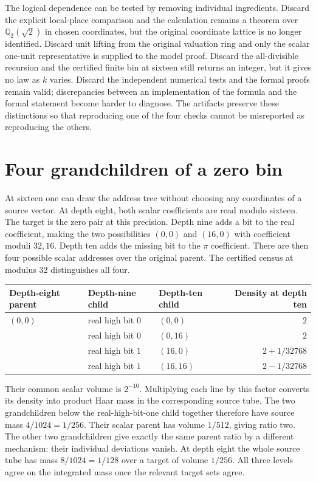 \documentclass[12pt,letterpaper]{article}
\begin{document}
The logical dependence can be tested by removing individual ingredients. Discard the explicit local-place comparison and the calculation remains a theorem over $\mathbb Q_2(\sqrt2)$ in chosen coordinates, but the original coordinate lattice is no longer identified. Discard unit lifting from the original valuation ring and only the scalar one-unit representative is supplied to the model proof. Discard the all-divisible recursion and the certified finite bin at sixteen still returns an integer, but it gives no law as $k$ varies. Discard the independent numerical tests and the formal proofs remain valid; discrepancies between an implementation of the formula and the formal statement become harder to diagnose. The artifacts preserve these distinctions so that reproducing one of the four checks cannot be misreported as reproducing the others.
\section{Four grandchildren of a zero bin}
At sixteen one can draw the address tree without choosing any coordinates of a source vector. At depth eight, both scalar coefficients are read modulo sixteen. The target is the zero pair at this precision. Depth nine adds a bit to the real coefficient, making the two possibilities $(0,0)$ and $(16,0)$ with coefficient moduli $32,16$. Depth ten adds the missing bit to the $\pi$ coefficient. There are then four possible scalar addresses over the original parent. The certified census at modulus 32 distinguishes all four.

\begin{center}\small
\begin{tabular}{@{}lllr@{}}\toprule
Depth-eight parent&Depth-nine child&Depth-ten child&Density at depth ten\\\midrule
$(0,0)$&real high bit $0$&$(0,0)$&$2$\\
&real high bit $0$&$(0,16)$&$2$\\[2pt]
&real high bit $1$&$(16,0)$&$2+1/32768$\\
&real high bit $1$&$(16,16)$&$2-1/32768$\\\bottomrule
\end{tabular}
\end{center}
Their common scalar volume is $2^{-10}$. Multiplying each line by this factor converts its density into product Haar mass in the corresponding source tube. The two grandchildren below the real-high-bit-one child together therefore have source mass $4/1024=1/256$. Their scalar parent has volume $1/512$, giving ratio two. The other two grandchildren give exactly the same parent ratio by a different mechanism: their individual deviations vanish. At depth eight the whole source tube has mass $8/1024=1/128$ over a target of volume $1/256$. All three levels agree on the integrated mass once the relevant target sets agree.
\end{document}
